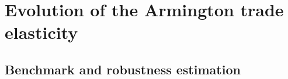 \documentclass{beamer}
\begin{document}

\section{Evolution of the Armington trade elasticity}
\subsection{Benchmark and robustness estimation}
\end{document}
